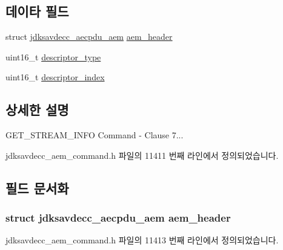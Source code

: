 \subsection*{데이타 필드}
\begin{DoxyCompactItemize}
\item 
struct \hyperlink{structjdksavdecc__aecpdu__aem}{jdksavdecc\+\_\+aecpdu\+\_\+aem} \hyperlink{structjdksavdecc__aem__command__get__stream__info_ae1e77ccb75ff5021ad923221eab38294}{aem\+\_\+header}
\item 
uint16\+\_\+t \hyperlink{structjdksavdecc__aem__command__get__stream__info_ab7c32b6c7131c13d4ea3b7ee2f09b78d}{descriptor\+\_\+type}
\item 
uint16\+\_\+t \hyperlink{structjdksavdecc__aem__command__get__stream__info_a042bbc76d835b82d27c1932431ee38d4}{descriptor\+\_\+index}
\end{DoxyCompactItemize}


\subsection{상세한 설명}
G\+E\+T\+\_\+\+S\+T\+R\+E\+A\+M\+\_\+\+I\+N\+FO Command -\/ Clause 7... 

jdksavdecc\+\_\+aem\+\_\+command.\+h 파일의 11411 번째 라인에서 정의되었습니다.



\subsection{필드 문서화}
\subsubsection[{\texorpdfstring{aem\+\_\+header}{aem_header}}]{\setlength{\rightskip}{0pt plus 5cm}struct {\bf jdksavdecc\+\_\+aecpdu\+\_\+aem} aem\+\_\+header}\hypertarget{structjdksavdecc__aem__command__get__stream__info_ae1e77ccb75ff5021ad923221eab38294}{}\label{structjdksavdecc__aem__command__get__stream__info_ae1e77ccb75ff5021ad923221eab38294}


jdksavdecc\+\_\+aem\+\_\+command.\+h 파일의 11413 번째 라인에서 정의되었습니다.


